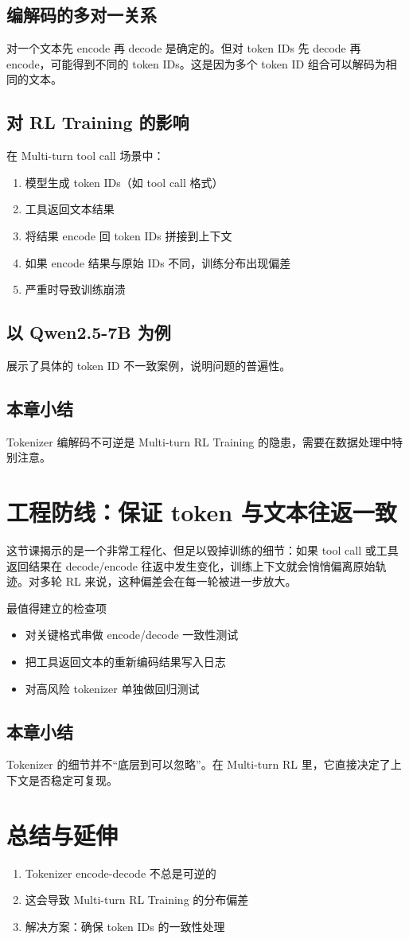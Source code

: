 \documentclass[a4paper]{article}
\begin{document}
\subsection{编解码的多对一关系}
对一个文本先 encode 再 decode 是确定的。但对 token IDs 先 decode 再 encode，可能得到不同的 token IDs。这是因为多个 token ID 组合可以解码为相同的文本。

\subsection{对 RL Training 的影响}
在 Multi-turn tool call 场景中：
\begin{enumerate}
  \item 模型生成 token IDs（如 tool call 格式）
  \item 工具返回文本结果
  \item 将结果 encode 回 token IDs 拼接到上下文
  \item 如果 encode 结果与原始 IDs 不同，训练分布出现偏差
  \item 严重时导致训练崩溃
\end{enumerate}

\subsection{以 Qwen2.5-7B 为例}
展示了具体的 token ID 不一致案例，说明问题的普遍性。

\subsection{本章小结}
Tokenizer 编解码不可逆是 Multi-turn RL Training 的隐患，需要在数据处理中特别注意。

\newpage
\section{工程防线：保证 token 与文本往返一致}
这节课揭示的是一个非常工程化、但足以毁掉训练的细节：如果 tool call 或工具返回结果在 decode/encode 往返中发生变化，训练上下文就会悄悄偏离原始轨迹。对多轮 RL 来说，这种偏差会在每一轮被进一步放大。

\begin{warningbox}{最值得建立的检查项}
\begin{itemize}
  \item 对关键格式串做 encode/decode 一致性测试
  \item 把工具返回文本的重新编码结果写入日志
  \item 对高风险 tokenizer 单独做回归测试
\end{itemize}
\end{warningbox}

\subsection{本章小结}
Tokenizer 的细节并不“底层到可以忽略”。在 Multi-turn RL 里，它直接决定了上下文是否稳定可复现。

\newpage
\section{总结与延伸}
\begin{enumerate}
  \item Tokenizer encode-decode 不总是可逆的
  \item 这会导致 Multi-turn RL Training 的分布偏差
  \item 解决方案：确保 token IDs 的一致性处理
\end{enumerate}
\end{document}
